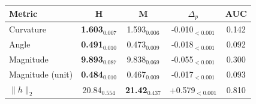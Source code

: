 \begin{tabular}{lcccc}
\toprule
\textbf{Metric} & \textbf{H} & \textbf{M} & \textbf{$\Delta_p$} & \textbf{AUC} \\
\midrule
Curvature & \textbf{1.603}$_{0.007}$ & 1.593$_{0.006}$ & -0.010$_{<0.001}$ & 0.142 \\
Angle & \textbf{0.491}$_{0.010}$ & 0.473$_{0.009}$ & -0.018$_{<0.001}$ & 0.092 \\
Magnitude & \textbf{9.893}$_{0.087}$ & 9.838$_{0.069}$ & -0.055$_{<0.001}$ & 0.300 \\
Magnitude (unit) & \textbf{0.484}$_{0.010}$ & 0.467$_{0.009}$ & -0.017$_{<0.001}$ & 0.093 \\
$\|h\|_2$ & 20.84$_{0.554}$ & \textbf{21.42}$_{0.437}$ & +0.579$_{<0.001}$ & 0.810 \\
\bottomrule
\end{tabular}
